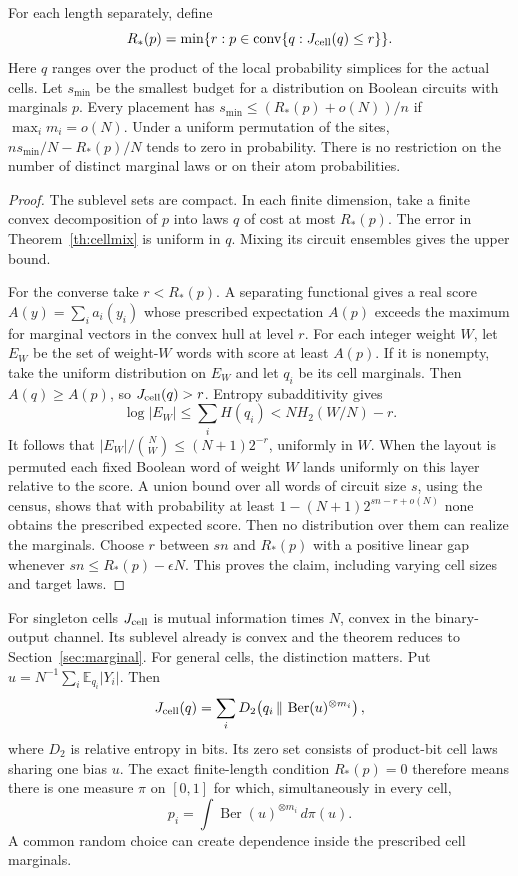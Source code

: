 \begin{theorem}\label{th:qconv}
For each length separately, define
\[
 R_*(p)=\min\{r:p\in\operatorname{conv}\{q:J_{\rm cell}(q)\le r\}\}.
\]
Here $q$ ranges over the product of the local probability simplices for the actual cells. Let $s_{\min}$ be the smallest budget for a distribution on Boolean circuits with marginals $p$. Every placement has $s_{\min}\le(R_*(p)+o(N))/n$ if $\max_i m_i=o(N)$. Under a uniform permutation of the sites, $n s_{\min}/N-R_*(p)/N$ tends to zero in probability. There is no restriction on the number of distinct marginal laws or on their atom probabilities.
\end{theorem}
\begin{proof}
The sublevel sets are compact. In each finite dimension, take a finite convex decomposition of $p$ into laws $q$ of cost at most $R_*(p)$. The error in Theorem~\ref{th:cellmix} is uniform in $q$. Mixing its circuit ensembles gives the upper bound.

For the converse take $r<R_*(p)$. A separating functional gives a real score $A(y)=\sum_i a_i(y_i)$ whose prescribed expectation $A(p)$ exceeds the maximum for marginal vectors in the convex hull at level $r$. For each integer weight $W$, let $E_W$ be the set of weight-$W$ words with score at least $A(p)$. If it is nonempty, take the uniform distribution on $E_W$ and let $q_i$ be its cell marginals. Then $A(q)\ge A(p)$, so $J_{\rm cell}(q)>r$. Entropy subadditivity gives
\[
 \log |E_W|\le\sum_i H(q_i)<N H_2(W/N)-r.
\]
It follows that $|E_W|/\binom NW\le(N+1)2^{-r}$, uniformly in $W$. When the layout is permuted each fixed Boolean word of weight $W$ lands uniformly on this layer relative to the score. A union bound over all words of circuit size $s$, using the census, shows that with probability at least $1-(N+1)2^{sn-r+o(N)}$ none obtains the prescribed expected score. Then no distribution over them can realize the marginals. Choose $r$ between $sn$ and $R_*(p)$ with a positive linear gap whenever $sn\le R_*(p)-\epsilon N$. This proves the claim, including varying cell sizes and target laws.
\end{proof}

For singleton cells $J_{\rm cell}$ is mutual information times $N$, convex in the binary-output channel. Its sublevel already is convex and the theorem reduces to Section~\ref{sec:marginal}. For general cells, the distinction matters. Put $u=N^{-1}\sum_i\mathbb E_{q_i}|Y_i|$. Then
\[
 J_{\rm cell}(q)=\sum_i D_2\!\left(q_i\,\Vert\,\operatorname{Ber}(u)^{\otimes m_i}\right),
\]
where $D_2$ is relative entropy in bits. Its zero set consists of product-bit cell laws sharing one bias $u$. The exact finite-length condition $R_*(p)=0$ therefore means there is one measure $\pi$ on $[0,1]$ for which, simultaneously in every cell,
\[
             p_i=\int \operatorname{Ber}(u)^{\otimes m_i}\,d\pi(u).
\]
A common random choice can create dependence inside the prescribed cell marginals.
